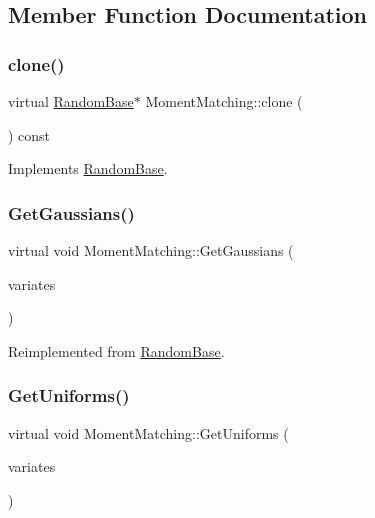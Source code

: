 \subsection{Member Function Documentation}
\hypertarget{classMomentMatching_a21274179f7a0cb3207b690e2e3da6c3a}{}\label{classMomentMatching_a21274179f7a0cb3207b690e2e3da6c3a} 
\subsubsection{\texorpdfstring{clone()}{clone()}}
{\footnotesize\ttfamily virtual \hyperlink{classRandomBase}{Random\+Base}$\ast$ Moment\+Matching\+::clone (\begin{DoxyParamCaption}{ }\end{DoxyParamCaption}) const\hspace{0.3cm}{\ttfamily [virtual]}}



Implements \hyperlink{classRandomBase_a0906f4590283535ec40427ad31ba7850}{Random\+Base}.

\hypertarget{classMomentMatching_ab3977dfbd2a433e0874e8a2501b1b6ac}{}\label{classMomentMatching_ab3977dfbd2a433e0874e8a2501b1b6ac} 
\subsubsection{\texorpdfstring{Get\+Gaussians()}{GetGaussians()}}
{\footnotesize\ttfamily virtual void Moment\+Matching\+::\+Get\+Gaussians (\begin{DoxyParamCaption}\item[{\hyperlink{classMJArray}{M\+J\+Array} \&}]{variates }\end{DoxyParamCaption})\hspace{0.3cm}{\ttfamily [virtual]}}



Reimplemented from \hyperlink{classRandomBase_aac297a1b64959492831f5e9a1f28c03d}{Random\+Base}.

\hypertarget{classMomentMatching_ae07e9d85774d2ab2f4c877313e986892}{}\label{classMomentMatching_ae07e9d85774d2ab2f4c877313e986892} 
\subsubsection{\texorpdfstring{Get\+Uniforms()}{GetUniforms()}}
{\footnotesize\ttfamily virtual void Moment\+Matching\+::\+Get\+Uniforms (\begin{DoxyParamCaption}\item[{\hyperlink{classMJArray}{M\+J\+Array} \&}]{variates }\end{DoxyParamCaption})\hspace{0.3cm}{\ttfamily [virtual]}}




